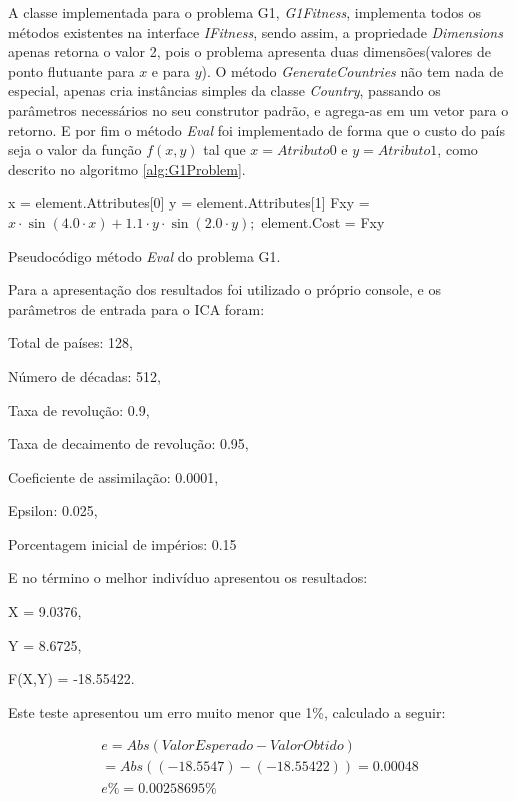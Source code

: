 A classe implementada para o problema G1, \emph{G1Fitness}, implementa todos os métodos existentes na interface \emph{IFitness}, sendo assim, a propriedade \emph{Dimensions} apenas retorna o valor 2, pois o problema apresenta duas dimensões(valores de ponto flutuante para \(x\) e para \(y\)). O método \emph{GenerateCountries} não tem nada de especial, apenas cria instâncias simples da classe \emph{Country}, passando os parâmetros necessários no seu construtor padrão, e agrega-as em um vetor para o retorno. E por fim o método \emph{Eval} foi implementado de forma que o custo do país seja o valor da função \(f(x,y)\) tal que \(x = Atributo0\) e \(y = Atributo1\), como descrito no algoritmo \ref{alg:G1Problem}.

\vspace{10px}
\begin{algorithm}[h]
\SetAlgoLined
{}
x = element.Attributes[0]\;
y = element.Attributes[1]\;
Fxy =\( x \cdot \sin(4.0 \cdot x) + 1.1 \cdot y \cdot \sin(2.0 \cdot y);\)\;
element.Cost = Fxy\;
\caption{ Pseudocódigo método \emph{Eval} do problema G1.}
\label{alg:G1Problem}
\end{algorithm}
\vspace{10px}

Para a apresentação dos resultados foi utilizado o próprio console, e os parâmetros de entrada para o ICA foram: 

Total de países: 128, 

Número de décadas: 512, 

Taxa de revolução: 0.9, 

Taxa de decaimento de revolução: 0.95, 

Coeficiente de assimilação: 0.0001, 

Epsilon: 0.025,

Porcentagem inicial de impérios: 0.15

E no término o melhor indivíduo apresentou os resultados: 

X = 9.0376,

Y = 8.6725,

F(X,Y) = -18.55422.

Este teste apresentou um erro muito menor que 1\%, calculado a seguir: 

\begin{equation}
\begin{split}
e = Abs(Valor Esperado - Valor Obtido ) 
\\= Abs((-18.5547) - (-18.55422)) = 0.00048 \\
e\%= 0.00258695\%
\end{split}
\end{equation}



